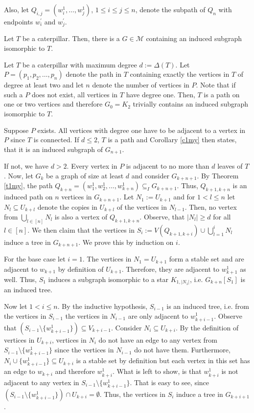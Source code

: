 Also, let $Q_{i,j}=(w_i^1 ,\dots , w_j^1 )$, $1\leq i\leq j\leq n$, denote the subpath of $Q_n$ with endpoints $w_i^\prime$ and $w_j^\prime$.

\begin{thm}
Let $T$ be a caterpillar. Then, there is a $G\in\mathcal{M}$ containing an induced subgraph isomorphic to $T$.
\end{thm}
\begin{prf}
Let $T$ be a caterpillar with maximum degree $d:=\Delta (T)$. Let $P=(p_1, p_2, \dots , p_n)$ denote the path in $T$ containing exactly the vertices in $T$ of degree at least two and let $n$ denote the number of vertices in $P$. Note that if such a $P$ does not exist, all vertices in $T$ have degree one. Then, $T$ is a path on one or two vertices and therefore $G_0=K_2$ trivially contains an induced subgraph isomorphic to $T$.

Suppose $P$ exists. All vertices with degree one have to be adjacent to a vertex in $P$ since $T$ is connected. If $d\leq 2$, $T$ is a path and Corollary \ref{c1my} then states, that it is an induced subgraph of $G_{n+1}$.

If not, we have $d>2$. Every vertex in $P$ is adjacent to no more than $d$ leaves of $T$. Now, let $G_k$ be a graph of size at least $d$ and consider $G_{k+n+1}$. By Theorem \ref{t1my}, the path $Q_{k+n}=(w^1_1,w^1_2,...,w^1_{k+n})\subseteq_I G_{k+n+1}$. Thus, $Q_{k+1,k+n}$ is an induced path on $n$ vertices in $G_{k+n+1}$. Let $N_1:=U_{k+1}$ and for $1<l\leq n$ let $N_l\subseteq U_{k+l}$ denote the copies in $U_{k+l}$ of the vertices in $N_{l-1}$. Then, no vertex from $\bigcup_{l\in [n]}N_l$ is also a vertex of $Q_{k+1,k+n}$. Observe, that $\vert N_l \vert \geq d$ for all $l\in [n]$. We then claim that the vertices in $S_i:=V(Q_{k+1,k+i})\cup\bigcup_{l=1}^i N_l$ induce a tree in $G_{k+n+1}$. We prove this by induction on $i$.

For the base case let $i=1$. The vertices in $N_1=U_{k+1}$ form a stable set  and are adjacent to $w_{k+1}$ by definition of $U_{k+1}$. Therefore, they are adjacent to $w^1_{k+1}$ as well. Thus, $S_1$ induces a subgraph isomorphic to a star $K_{1,\vert N_1\vert}$, i.e. $G_{k+n}[S_1]$ is an induced tree.

Now let $1<i\leq n$. By the inductive hypothesis, $S_{i-1}$ is an induced tree, i.e. from the vertices in $S_{i-1}$ the vertices in $N_{i-1}$ are only adjacent to $w_{k+i-1}^1$. Observe that $(S_{i-1}\setminus \lbrace w_{k+i-1}^1\rbrace )\subseteq V_{k+i-1}$. Consider $N_i\subseteq U_{k+i}$. By the definition of vertices in $U_{k+i}$, vertices in $N_i$ do not have an edge to any vertex from $S_{i-1}\setminus \lbrace w_{k+i-1}^1\rbrace$ since the vertices in $N_{i-1}$ do not have them. Furthermore, $N_i\cup\lbrace w_{k+i-1}^1\rbrace \subseteq U_{k+i}$ is a stable set by definition but each vertex in this set has an edge to $w_{k+i}$ and therefore $w_{k+i}^1$. What is left to show, is that $w_{k+i}^1$ is not adjacent to any vertex in $S_{i-1}\setminus \lbrace w_{k+i-1}^1\rbrace$. That is easy to see, since $(S_{i-1}\setminus \lbrace w_{k+i-1}^1\rbrace )\cap U_{k+i}=\emptyset$. Thus, the vertices in $S_i$ induce a tree in $G_{k+i+1}$.


\end{prf}
